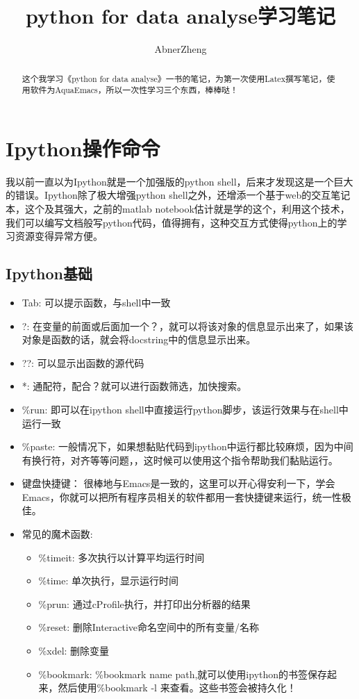 \documentclass[UTF8]{ctexart}
\begin{document}
\author{AbnerZheng}
\title{python for data analyse学习笔记}
\maketitle{}
\begin{abstract}
  这个我学习《python for data analyse》一书的笔记，为第一次使用Latex撰写笔记，使用软件为AquaEmacs，所以一次性学习三个东西，棒棒哒！
\end{abstract}
\tableofcontents{}
\section{Ipython操作命令}
\label{sec:Ipython}

我以前一直以为Ipython就是一个加强版的python shell，后来才发现这是一个巨大的错误。Ipython除了极大增强python shell之外，还增添一个基于web的交互笔记本，这个及其强大，之前的matlab notebook估计就是学的这个，利用这个技术，我们可以编写文档般写python代码，值得拥有，这种交互方式使得python上的学习资源变得异常方便。

\subsection{Ipython基础}
\label{sec:ipython_basic}

\begin{itemize}
\item Tab: 可以提示函数，与shell中一致
\item ?: 在变量的前面或后面加一个？，就可以将该对象的信息显示出来了，如果该对象是函数的话，就会将docstring中的信息显示出来。
\item ??: 可以显示出函数的源代码
\item *: 通配符，配合？就可以进行函数筛选，加快搜索。
\item \%run: 即可以在ipython shell中直接运行python脚步，该运行效果与在shell中运行一致
\item \%paste: 一般情况下，如果想黏贴代码到ipython中运行都比较麻烦，因为中间有换行符，对齐等等问题，，这时候可以使用这个指令帮助我们黏贴运行。
\item 键盘快捷键： 很棒地与Emacs是一致的，这里可以开心得安利一下，学会Emacs，你就可以把所有程序员相关的软件都用一套快捷键来运行，统一性极佳。
\item 常见的魔术函数:
  \begin{itemize}
  \item \%timeit: 多次执行以计算平均运行时间
  \item \%time: 单次执行，显示运行时间
  \item \%prun: 通过cProfile执行，并打印出分析器的结果
  \item \%reset: 删除Interactive命名空间中的所有变量/名称
  \item \%xdel: 删除变量
  \item \%bookmark: \%bookmark name path,就可以使用ipython的书签保存起来，然后使用\%bookmark -l 来查看。这些书签会被持久化！
  \end{itemize}
\end{itemize}
\end{document}
